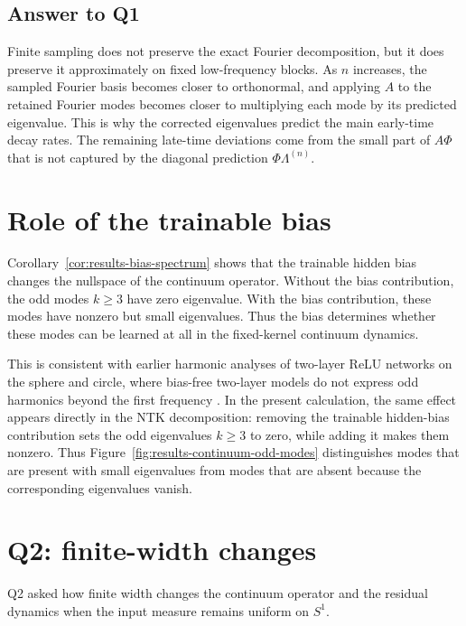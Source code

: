 \subsection{Answer to Q1}
\label{subsec:discussion-answer-q1}

Finite sampling does not preserve the exact Fourier decomposition, but it does
preserve it approximately on fixed low-frequency blocks. As \(n\) increases, the
sampled Fourier basis becomes closer to orthonormal, and applying \(A\) to the
retained Fourier modes becomes closer to multiplying each mode by its predicted
eigenvalue. This is why the corrected eigenvalues predict the main early-time
decay rates. The remaining late-time deviations come from the small part of
\(A\Phi\) that is not captured by the diagonal prediction
\(\Phi\Lambda^{(n)}\).

\section{Role of the trainable bias}
\label{sec:discussion-bias}

Corollary~\ref{cor:results-bias-spectrum} shows that the trainable hidden bias
changes the nullspace of the continuum operator. Without the bias contribution,
the odd modes \(k\ge 3\) have zero eigenvalue. With the bias contribution, these
modes have nonzero but small eigenvalues. Thus the bias determines whether these
modes can be learned at all in the fixed-kernel continuum dynamics.

This is consistent with earlier harmonic analyses of two-layer ReLU networks on
the sphere and circle, where bias-free two-layer models do not express odd
harmonics beyond the first frequency
\citep{basri2019convergence,basri2020frequencybiasneuralnetworks}. In the
present calculation, the same effect appears directly in the NTK decomposition:
removing the trainable hidden-bias contribution sets the odd eigenvalues
\(k\ge 3\) to zero, while adding it makes them nonzero. Thus
Figure~\ref{fig:results-continuum-odd-modes} distinguishes modes that are
present with small eigenvalues from modes that are absent because the
corresponding eigenvalues vanish.

\section{Q2: finite-width changes}
\label{sec:discussion-q2}

Q2 asked how finite width changes the continuum operator and the residual
dynamics when the input measure remains uniform on \(S^1\).

